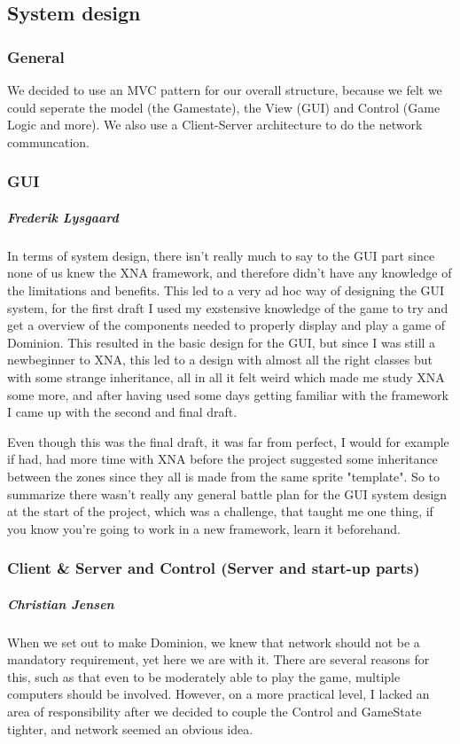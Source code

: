 \subsection{System design}
\subsubsection{General}
We decided to use an MVC pattern for our overall structure, because we felt we could seperate the model (the Gamestate), the View (GUI) and Control (Game Logic and more). We also use a Client-Server architecture to do the network communcation.

\subsubsection{GUI}
\subparagraph{Frederik Lysgaard}
In terms of system design, there isn't really much to say to the GUI part since none of us knew the XNA framework, and therefore didn't have any knowledge of the limitations and benefits.
This led to a very ad hoc way of designing the GUI system, for the first draft I used my exstensive knowledge of the game to try and get a overview of the components needed to properly display and play a game of Dominion. 
This resulted in the basic design for the GUI, but since I was still a newbeginner to XNA, this led to a design with almost all the right classes but with some strange inheritance, all in all it felt weird which made me study XNA some more, and after having used some days getting familiar with the framework I came up with the second and final draft.

Even though this was the final draft, it was far from perfect, I would for example if had, had more time with XNA before the project suggested some inheritance between the zones since they all is made from the same sprite "template". So to summarize there wasn't really any general battle plan for the GUI system design at the start of the project, which was a challenge, that taught me one thing, if you know you're going to work in a new framework, learn it beforehand.

\subsubsection{Client \& Server and Control (Server and start-up parts)}
\subparagraph{Christian Jensen}
When we set out to make Dominion, we knew that network should not be a mandatory requirement, yet here we are with it.
There are several reasons for this, such as that even to be moderately able to play the game, multiple computers should be involved.
However, on a more practical level, I lacked an area of responsibility after we decided to couple the Control and GameState tighter, and network seemed an obvious idea.


